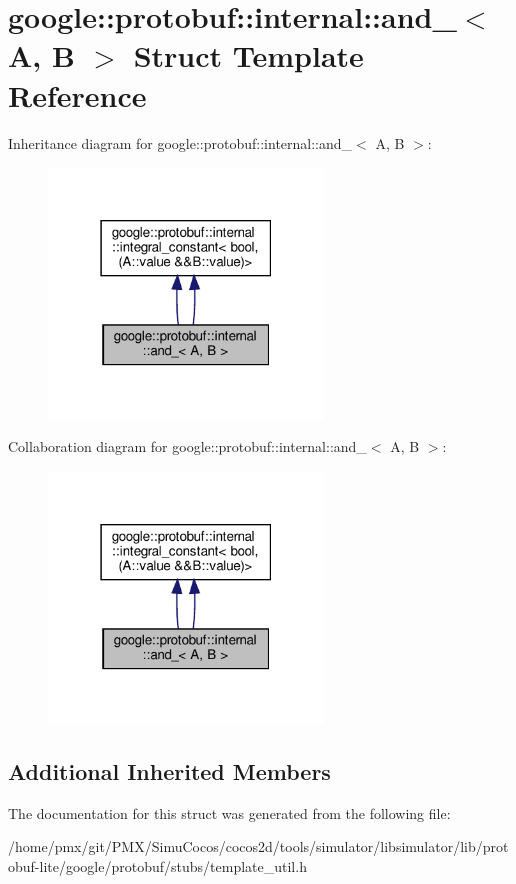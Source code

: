 \hypertarget{structgoogle_1_1protobuf_1_1internal_1_1and__}{}\section{google\+:\+:protobuf\+:\+:internal\+:\+:and\+\_\+$<$ A, B $>$ Struct Template Reference}
\label{structgoogle_1_1protobuf_1_1internal_1_1and__}


Inheritance diagram for google\+:\+:protobuf\+:\+:internal\+:\+:and\+\_\+$<$ A, B $>$\+:
\nopagebreak
\begin{figure}[H]
\begin{center}
\leavevmode
\includegraphics[width=207pt]{structgoogle_1_1protobuf_1_1internal_1_1and____inherit__graph}
\end{center}
\end{figure}


Collaboration diagram for google\+:\+:protobuf\+:\+:internal\+:\+:and\+\_\+$<$ A, B $>$\+:
\nopagebreak
\begin{figure}[H]
\begin{center}
\leavevmode
\includegraphics[width=207pt]{structgoogle_1_1protobuf_1_1internal_1_1and____coll__graph}
\end{center}
\end{figure}
\subsection*{Additional Inherited Members}


The documentation for this struct was generated from the following file\+:\begin{DoxyCompactItemize}
\item 
/home/pmx/git/\+P\+M\+X/\+Simu\+Cocos/cocos2d/tools/simulator/libsimulator/lib/protobuf-\/lite/google/protobuf/stubs/template\+\_\+util.\+h\end{DoxyCompactItemize}
